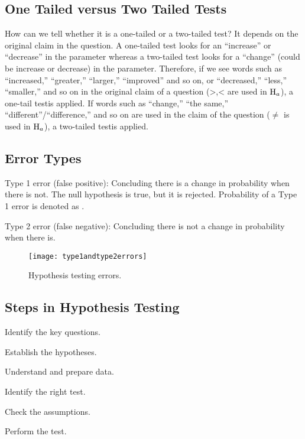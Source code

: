 	\subsection{One Tailed versus Two Tailed Tests}
How can we tell whether it is a one-tailed or a two-tailed test?  It depends on the original claim in the question.  A one-tailed test looks for an ``increase'' or ``decrease'' in the parameter whereas a two-tailed test looks for a ``change'' (could be increase or decrease) in the parameter.  Therefore, if we see words such as ``increased,'' ``greater,'' ``larger,'' ``improved'' and so on, or ``decreased,'' ``less,'' ``smaller,'' and so on in the original claim of a question (>,< are used in $\mbox{$\textrm{H}_a$}$), a one-tail testis applied.  If words such as ``change,'' ``the same,'' ``different''/``difference,'' and so on are used in the claim of the question ($\neq$ is used in $\mbox{$\textrm{H}_a$}$), a two-tailed testis applied.

	\subsection{Error Types}
Type 1 error (false positive): Concluding there is a change in probability when there is not.  The null hypothesis is true, but it is rejected.  Probability of a Type 1 error is denoted as \levelofsignificance{}.

Type 2 error (false negative): Concluding there is not a change in probability when there is.

	\begin{figure}[tbp]
		\centering
		\texttt{[image: type1andtype2errors]}
		\caption[Hypothesis testing errors]{Hypothesis testing errors.}
		\label{fig:type1andtype2errors}
	\end{figure}

	\subsection{Steps in Hypothesis Testing}
	\begin{numberedlist}
		\item Identify the key questions.
		\item Establish the hypotheses.
		\item Understand and prepare data.
		\item Identify the right test.
		\item Check the assumptions.
		\item Perform the test.
	\end{numberedlist}

